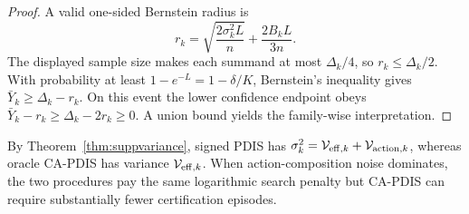 \begin{proof}
A valid one-sided Bernstein radius is
\[
r_k=\sqrt{\frac{2\sigma_k^2L}{n}}+\frac{2B_kL}{3n}.
\]
The displayed sample size makes each summand at most $\Delta_k/4$, so $r_k\le\Delta_k/2$. With probability at least $1-e^{-L}=1-\delta/K$, Bernstein's inequality gives $\bar Y_k\ge\Delta_k-r_k$. On this event the lower confidence endpoint obeys
$\bar Y_k-r_k\ge\Delta_k-2r_k\ge0$.
A union bound yields the family-wise interpretation.
\end{proof}

By Theorem~\ref{thm:suppvariance}, signed PDIS has
$\sigma_k^2=\mathcal V_{{\rm eff},k}+\mathcal V_{{\rm action},k}$,
whereas oracle CA-PDIS has variance $\mathcal V_{{\rm eff},k}$. When action-composition noise dominates, the two procedures pay the same logarithmic search penalty but CA-PDIS can require substantially fewer certification episodes.
